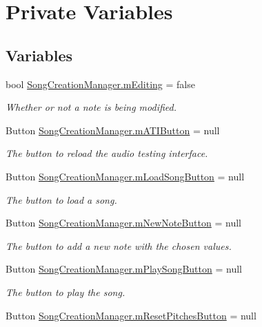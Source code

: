 \hypertarget{group___s_c_m_priv_var}{}\section{Private Variables}
\label{group___s_c_m_priv_var}
\subsection*{Variables}
\begin{DoxyCompactItemize}
\item 
bool \hyperlink{group___s_c_m_priv_var_gad2a61787c63fb8770d3c8100adfae9cf}{Song\+Creation\+Manager.\+m\+Editing} = false
\begin{DoxyCompactList}\small\item\em Whether or not a note is being modified. \end{DoxyCompactList}\item 
Button \hyperlink{group___s_c_m_priv_var_gae702ec5de2c75149b8c650db9ac260a6}{Song\+Creation\+Manager.\+m\+A\+T\+I\+Button} = null
\begin{DoxyCompactList}\small\item\em The button to reload the audio testing interface. \end{DoxyCompactList}\item 
Button \hyperlink{group___s_c_m_priv_var_ga7851ecd194d87e14fa186fc76e154222}{Song\+Creation\+Manager.\+m\+Load\+Song\+Button} = null
\begin{DoxyCompactList}\small\item\em The button to load a song. \end{DoxyCompactList}\item 
Button \hyperlink{group___s_c_m_priv_var_gac17f83788e480bb97160d17bbe69aab3}{Song\+Creation\+Manager.\+m\+New\+Note\+Button} = null
\begin{DoxyCompactList}\small\item\em The button to add a new note with the chosen values. \end{DoxyCompactList}\item 
Button \hyperlink{group___s_c_m_priv_var_ga4ba18826907a0efbeb2ad62444124657}{Song\+Creation\+Manager.\+m\+Play\+Song\+Button} = null
\begin{DoxyCompactList}\small\item\em The button to play the song. \end{DoxyCompactList}\item 
Button \hyperlink{group___s_c_m_priv_var_ga7f15c9af246da41fe9f7aafb16744214}{Song\+Creation\+Manager.\+m\+Reset\+Pitches\+Button} = null

\end{DoxyCompactItemize}
